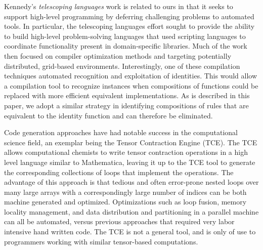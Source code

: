 Kennedy's \emph{telescoping languages} work is related to ours in that it seeks to support high-level programming by deferring challenging problems to automated tools. In particular, the telescoping languages effort sought to provide the ability to build high-level problem-solving languages that used scripting languages to coordinate functionality present in domain-specific libraries\cite{kennedy00telescoping}. Much of the work then focused on compiler optimization methods and targeting potentially distributed, grid-based environments. Interestingly, one of these compilation techniques automated recognition and exploitation of identities. This would allow a compilation tool to recognize instances when compositions of functions could be replaced with more efficient equivalent implementations. As is described in this paper, we adopt a similar strategy in identifying compositions of rules that are equivalent to the identity function and can therefore be eliminated.

Code generation approaches have had notable success in the computational science field, an exemplar being the Tensor Contraction Engine (TCE)\cite{baumgartner05synthesis}. The TCE allows computational chemists to write tensor contraction operations in a high level language similar to Mathematica, leaving it up to the TCE tool to generate the corresponding collections of loops that implement the operations. The advantage of this approach is that tedious and often error-prone nested loops over many large arrays with a correspondingly large number of indices can be both machine generated and optimized. Optimizations such as loop fusion, memory locality management, and data distribution and partitioning in a parallel machine can all be automated, versus previous approaches that required very labor intensive hand written code. The TCE is not a general tool, and is only of use to programmers working with similar tensor-based computations.
